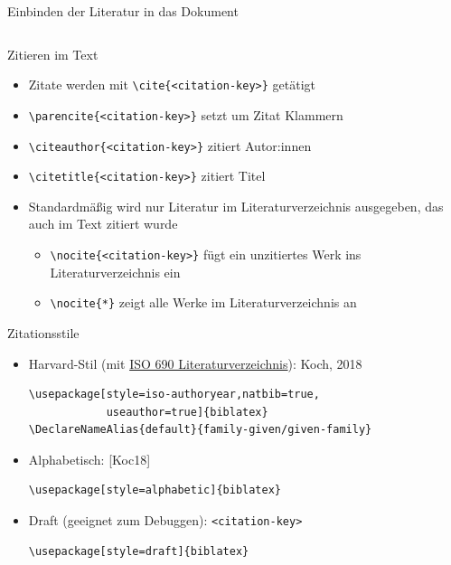 \documentclass[presentation,aspectratio=169]{beamer}
\begin{document}
\begin{frame}[fragile]{Einbinden der Literatur in das Dokument}
  \inputminted{latex}{codebeispiele/inclusion-literature.tex}
\end{frame}

\begin{frame}[fragile]{Zitieren im Text}
  \begin{itemize}
    \item Zitate werden mit \verb|\cite{<citation-key>}| getätigt
    \item \verb|\parencite{<citation-key>}| setzt um Zitat Klammern
    \item \verb|\citeauthor{<citation-key>}| zitiert Autor:innen
    \item \verb|\citetitle{<citation-key>}| zitiert Titel
      \bigskip
    \item Standardmäßig wird nur Literatur im Literaturverzeichnis ausgegeben, das auch im Text zitiert wurde
      \begin{itemize}
        \item \verb|\nocite{<citation-key>}| fügt ein unzitiertes Werk ins Literaturverzeichnis ein
        \item \verb|\nocite{*}| zeigt alle Werke im Literaturverzeichnis an
      \end{itemize}
  \end{itemize}
\end{frame}

\begin{frame}[fragile]{Zitationsstile}
  \begin{itemize}
    \item Harvard-Stil (mit \href{https://ctan.org/pkg/biblatex-iso690?lang=en}{ISO 690 Literaturverzeichnis}): Koch, 2018
      \begin{verbatim}
\usepackage[style=iso-authoryear,natbib=true,
            useauthor=true]{biblatex}
\DeclareNameAlias{default}{family-given/given-family}
      \end{verbatim}
    \item Alphabetisch: [Koc18]
      \begin{verbatim}
\usepackage[style=alphabetic]{biblatex}
      \end{verbatim}
    \item Draft (geeignet zum Debuggen): \verb|<citation-key>|
      \begin{verbatim}
\usepackage[style=draft]{biblatex}
      \end{verbatim}
  \end{itemize}
\end{frame}
\end{document}

